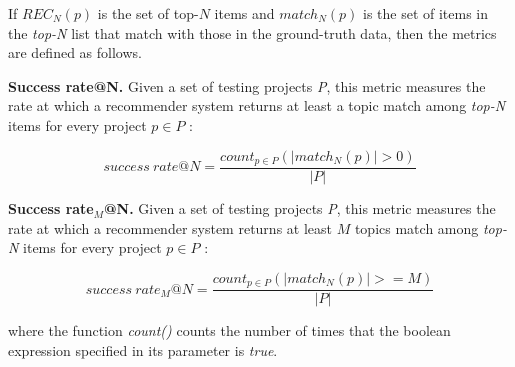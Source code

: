 If $REC_{N}(p)$ is the set of top-$N$ items and $match_{N}(p)$ is the set of items in the \emph{top-N} list that match with those in the ground-truth data, then the metrics are defined as follows.  

\vspace{.1cm}
\noindent\textbf{Success rate@N.} Given a set of testing projects \emph{P}, this metric measures the rate at which a recommender system returns at least a topic match among \emph{top-N} items for every project $p \in P$ \cite{6671293}: %
\vspace{-.1cm}

\begin{equation} \label{eqn:RecallRate}
success\ rate@N=\frac{ count_{p \in P}( \left | match_{N}(p) \right | > 0 ) }{\left | P \right |} %
\end{equation}

\vspace{.1cm}
\vspace{.1cm}
\noindent {} \textbf{Success rate$_M$@N.} Given a set of testing projects \emph{P}, this metric measures the rate at which a recommender system returns at least $M$ topics match among \emph{top-N} items for every project $p \in P$ \cite{6671293}: %
\vspace{-.1cm}

\begin{equation} \label{eqn:RecallRate}
success\ rate_M@N=\frac{ count_{p \in P}( \left | match_{N}(p) \right | >= M ) }{\left | P \right |} %
\end{equation}

\vspace{.1cm}
\noindent where the function \emph{count()} counts the number of times that the boolean expression specified in its parameter is \emph{true}.

